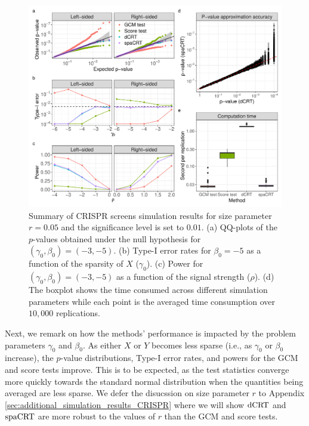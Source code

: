 \documentclass[12pt]{article}
\theoremstyle{definition}
\newcommand{\srx}{X}									%
\newcommand{\sry}{Y}									%
\newcommand{\dCRT}{\textnormal{dCRT}} 					%
\newcommand{\spacrt}{\textnormal{spaCRT}}               %
\begin{document}
  \begin{figure}[!ht]
	  \centering
	  \includegraphics[width=1.0\textwidth]{figures-and-tables/simulation/NB-regression/summary/simulation-summary.pdf}
	  \caption{\small{Summary of CRISPR screens simulation results for size parameter $r = 0.05$ and the significance level is set to $0.01$. (a) QQ-plots of the $p$-values obtained under the null hypothesis for $(\gamma_0, \beta_0) = (-3, -5)$. (b) Type-I error rates for $\beta_0 = -5$ as a function of the sparsity of $\srx$ ($\gamma_0$). (c) Power for $(\gamma_0, \beta_0) = (-3, -5)$ as a function of the signal strength ($\rho$). (d) The boxplot shows the time consumed across different simulation parameters while each point is the averaged time consumption over $10,000$ replications.}}
	  \label{fig:simulation-summary}
  \end{figure}
  
  Next, we remark on how the methods' performance is impacted by the problem parameters $\gamma_0$ and $\beta_0$. As either $\srx$ or $\sry$ becomes less sparse (i.e., as $\gamma_0$ or $\beta_0$ increase), the $p$-value distributions, Type-I error rates, and powers for the GCM and score tests improve. This is to be expected, as the test statistics converge more quickly towards the standard normal distribution when the quantities being averaged are less sparse. We defer the disucssion on size parameter $r$ to Appendix \ref{sec:additional_simulation_results_CRISPR} where we will show $\dCRT$ and $\spacrt$ are more robust to the values of $r$ than the GCM and score tests.
  
\end{document}
